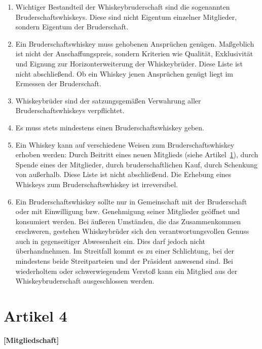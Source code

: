 \documentclass[a4paper,12pt]{scrartcl}
\begin{document}
\begin{enumerate}

\item Wichtiger Bestandteil der Whiskeybruderschaft sind die sogenannten Bruderschaftswhiskeys.
  Diese sind nicht Eigentum einzelner Mitglieder, sondern Eigentum der Bruderschaft.

\item Ein Bruderschaftswhiskey muss gehobenen Ansprüchen genügen. Maßgeblich ist nicht der
  Anschaffungspreis, sondern Kriterien wie Qualität, Exklusivität und Eignung zur
  Horizonterweiterung der Whiskeybrüder. Diese Liste ist nicht abschließend. Ob ein Whiskey jenen
  Ansprüchen genügt liegt im Ermessen der Bruderschaft.

\item Whiskeybrüder sind der satzungsgemäßen Verwahrung aller Bruderschaftswhiskeys verpflichtet.

\item Es muss stets mindestens einen Bruderschaftswhiskey geben.

\item Ein Whiskey kann auf verschiedene Weisen zum Bruderschaftswhiskey erhoben werden: Durch
  Beitritt eines neuen Mitglieds (siehe Artikel~\ref{sec:mitgliedschaft}), durch Spende eines der
  Mitglieder, durch bruderschaftlichen Kauf, durch Schenkung von außerhalb. Diese Liste ist nicht
  abschließend. Die Erhebung eines Whiskeys zum Bruderschaftswhiskey ist irreversibel.

\item Ein Bruderschaftswhiskey sollte nur in Gemeinschaft mit der Bruderschaft oder mit Einwilligung
  bzw. Genehmigung seiner Mitglieder geöffnet und konsumiert werden. Bei äußeren Umständen, die das
  Zusammenkommen erschweren, gestehen Whiskeybrüder sich den verantwortungsvollen Genuss auch in
  gegenseitiger Abwesenheit ein. Dies darf jedoch nicht überhandnehmen. Im Streitfall kommt es zu
  einer Schlichtung, bei der mindestens beide Streitparteien und der Präsident anwesend sind. Bei
  wiederholtem oder schwerwiegendem Verstoß kann ein Mitglied aus der Whiskeybruderschaft
  ausgeschlossen werden.

\end{enumerate}



\section{Artikel 4}
\label{sec:mitgliedschaft}
\textbf{[Mitgliedschaft]}
\end{document}
